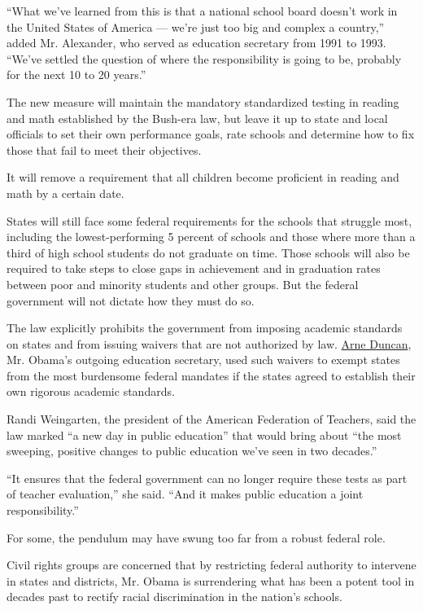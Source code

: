 ``What we've learned from this is that a national school board doesn't
work in the United States of America --- we're just too big and complex
a country,'' added Mr. Alexander, who served as education secretary from
1991 to 1993. ``We've settled the question of where the responsibility
is going to be, probably for the next 10 to 20 years.''

The new measure will maintain the mandatory standardized testing in
reading and math established by the Bush-era law, but leave it up to
state and local officials to set their own performance goals, rate
schools and determine how to fix those that fail to meet their
objectives.

It will remove a requirement that all children become proficient in
reading and math by a certain date.

States will still face some federal requirements for the schools that
struggle most, including the lowest-performing 5 percent of schools and
those where more than a third of high school students do not graduate on
time. Those schools will also be required to take steps to close gaps in
achievement and in graduation rates between poor and minority students
and other groups. But the federal government will not dictate how they
must do so.

The law explicitly prohibits the government from imposing academic
standards on states and from issuing waivers that are not authorized by
law.
\href{http://topics.nytimes.com/top/reference/timestopics/people/d/arne_duncan/index.html?inline=nyt-per}{Arne
Duncan}, Mr. Obama's outgoing education secretary, used such waivers to
exempt states from the most burdensome federal mandates if the states
agreed to establish their own rigorous academic standards.

Randi Weingarten, the president of the American Federation of Teachers,
said the law marked ``a new day in public education'' that would bring
about ``the most sweeping, positive changes to public education we've
seen in two decades.''

``It ensures that the federal government can no longer require these
tests as part of teacher evaluation,'' she said. ``And it makes public
education a joint responsibility.''

For some, the pendulum may have swung too far from a robust federal
role.

Civil rights groups are concerned that by restricting federal authority
to intervene in states and districts, Mr. Obama is surrendering what has
been a potent tool in decades past to rectify racial discrimination in
the nation's schools.


